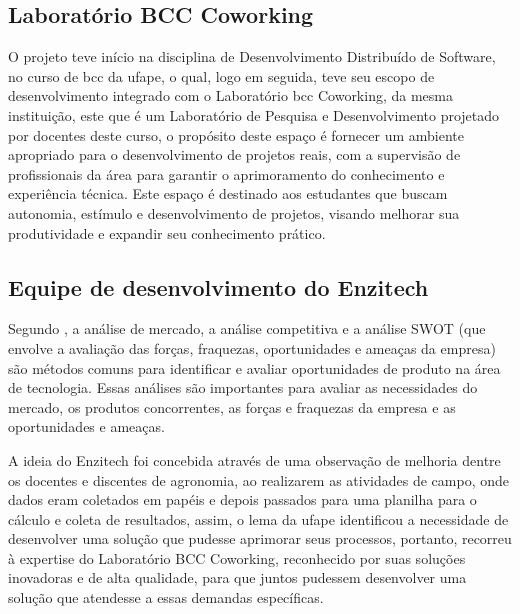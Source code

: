 \subsection{Laboratório BCC Coworking}\label{sec:lab}
O projeto teve início na disciplina de Desenvolvimento Distribuído de Software, no curso de \ac{bcc} da \ac{ufape}, o qual, logo em seguida, teve seu escopo de desenvolvimento integrado com o Laboratório \ac{bcc} Coworking, da mesma instituição, este que é um Laboratório de Pesquisa e Desenvolvimento projetado por docentes deste curso, o propósito deste espaço é fornecer um ambiente apropriado para o desenvolvimento de projetos reais, com a supervisão de profissionais da área para garantir o aprimoramento do conhecimento e experiência técnica. Este espaço é destinado aos estudantes que buscam autonomia, estímulo e desenvolvimento de projetos, visando melhorar sua produtividade e expandir seu conhecimento prático.

\subsection{Equipe de desenvolvimento do Enzitech}
Segundo \cite{pressman2016engenharia}, a análise de mercado, a análise competitiva e a análise SWOT (que envolve a avaliação das forças, fraquezas, oportunidades e ameaças da empresa) são métodos comuns para identificar e avaliar oportunidades de produto na área de tecnologia. Essas análises são importantes para avaliar as necessidades do mercado, os produtos concorrentes, as forças e fraquezas da empresa e as oportunidades e ameaças. 

A ideia do Enzitech foi concebida através de uma observação de melhoria dentre os docentes e discentes de agronomia, ao realizarem as atividades de campo, onde dados eram coletados em papéis e depois passados para uma planilha para o cálculo e coleta de resultados, assim, o \ac{lema} da \ac{ufape} identificou a necessidade de desenvolver uma solução que pudesse aprimorar seus processos, portanto, recorreu à expertise do Laboratório BCC Coworking, reconhecido por suas soluções inovadoras e de alta qualidade, para que juntos pudessem desenvolver uma solução que atendesse a essas demandas específicas. 

